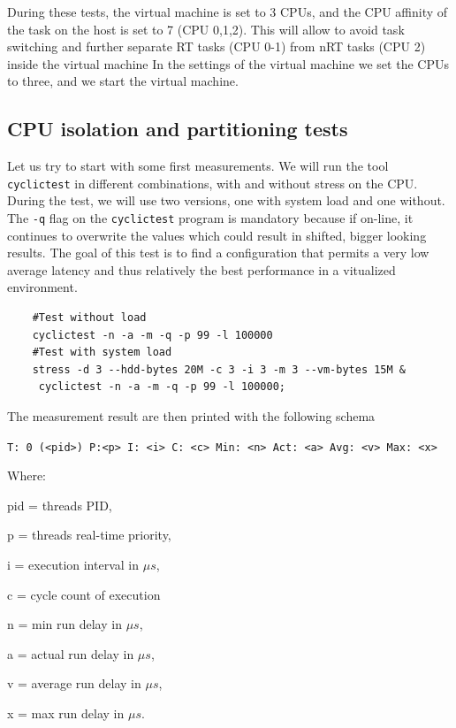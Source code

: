 \documentclass[]{scrartcl}
\begin{document}
During these tests, the virtual machine is set to 3 CPUs, and the CPU affinity of the task on the host is set to 7 (CPU 0,1,2). This will allow to avoid task switching and further separate RT tasks (CPU 0-1) from nRT tasks (CPU 2) inside the virtual machine
In the settings of the virtual machine we set the CPUs to three, and we start the virtual machine.  
%
%

\subsection{CPU isolation and partitioning tests}

Let us try to start with some first measurements. We will run the tool \texttt{cyclictest} in different combinations, with and without stress on the CPU. During the test, we will use two versions, one with system load and one without. The \texttt{-q} flag on the \texttt{cyclictest} program is mandatory because if on-line, it continues to overwrite the values which could result in shifted, bigger looking results. The goal of this test is to find a configuration that permits a very low average latency and thus relatively the best performance in a vitualized environment.

\begin{verbatim}
	#Test without load
	cyclictest -n -a -m -q -p 99 -l 100000
	#Test with system load
	stress -d 3 --hdd-bytes 20M -c 3 -i 3 -m 3 --vm-bytes 15M &
	 cyclictest -n -a -m -q -p 99 -l 100000;
\end{verbatim}

The measurement result are then printed with the following schema
\bigskip

\noindent \small \texttt{T: 0 (<pid>) P:<p> I: <i> C: <c> Min: <n> Act: <a> Avg: <v> Max: <x>}
\bigskip

Where:
\begin{where}
	\item[pid =] threads PID,
	\item[p =] threads real-time priority,
	\item[i =] execution interval in $\mu s$,
	\item[c =] cycle count of execution
	\item[n =] min run delay in $\mu s$,
	\item[a =] actual run delay in $\mu s$,
	\item[v =] average run delay in $\mu s$,
	\item[x =] max run delay in $\mu s$.
\end{where} 
\end{document}
